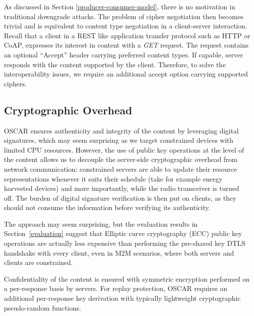 \documentclass[conference]{IEEEtran}
\begin{document}
As discussed in Section \ref{producer-consumer-model}, there is no motivation in traditional downgrade attacks.
The problem of cipher negotiation then becomes trivial and is equivalent to content type negotiation
in a client-server interaction. Recall that a client in a REST like application
transfer protocol such as HTTP or CoAP, expresses its interest in content with a
\textit{GET} request. The request contains an optional ``Accept'' header
carrying preferred content types. If capable, server responds with the content supported by the client. Therefore, to solve the interoperability issues, we require an additional accept option carrying supported ciphers. 











\subsection{Cryptographic Overhead}
\label{crypto} 

OSCAR ensures authenticity and integrity of the content by leveraging digital
signatures, which may seem surprising as we target constrained devices with
limited CPU resources. However, the use of public key operations at the level of
the content allows us to decouple the server-side cryptographic overhead from
network communication: constrained servers are able to update their
resource representations whenever it suits their schedule (take for example
energy harvested devices) and more importantly, while the radio transceiver is
turned off. The burden of digital signature verification is then put on clients,
as they should not consume the information before verifying its authenticity.

The approach may seem surprising, but the evaluation results in Section~\ref{evaluation} suggest that Elliptic curve cryptography (ECC) public key operations
are actually less expensive than performing the pre-shared key DTLS handshake with every client, even in M2M scenarios, where both servers and clients are constrained.

Confidentiality of the content is ensured with symmetric encryption performed on a per-response basis by servers. For replay protection, OSCAR requires an additional per-response key derivation with typically lightweight cryptographic pseudo-random functions.
\end{document}
